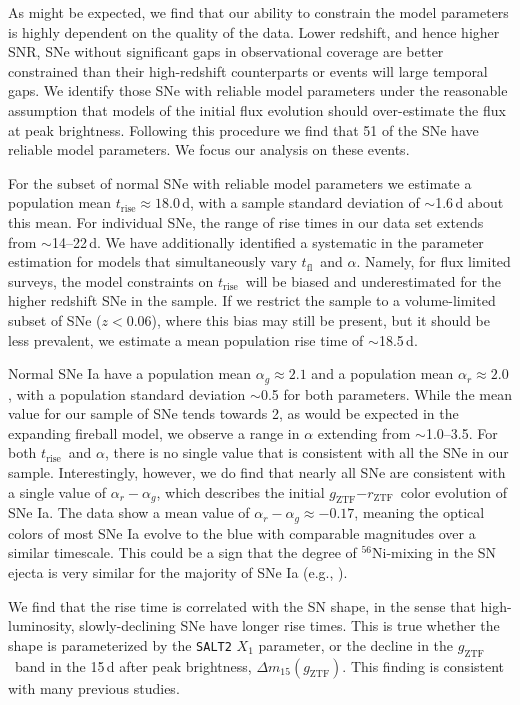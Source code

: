 \documentclass[twocolumn]{./aastex63}
\newcommand{\rztf}{$r_\mathrm{ZTF}$}
\newcommand{\gztf}{$g_\mathrm{ZTF}$}
\newcommand{\tfl}{$t_\mathrm{fl}$}
\newcommand{\trise}{$t_\mathrm{rise}$}
\begin{document}
As might be expected, we find that our ability to constrain the model parameters
is highly dependent on the quality of the data. Lower redshift, and hence higher
SNR, SNe without significant gaps in observational coverage are better
constrained than their high-redshift counterparts or events will large temporal
gaps. We identify those SNe with reliable model parameters under the reasonable
assumption that models of the initial flux evolution should over-estimate the
flux at peak brightness. Following this procedure we find that 51 of the SNe
have reliable model parameters. We focus our analysis on these events.

For the subset of normal SNe with reliable model parameters we estimate a
population mean \trise$ \approx 18.0$\,d, with a sample standard deviation of
$\sim$1.6\,d about this mean. For individual SNe, the range of rise times in our
data set extends from $\sim$14--22\,d. We have additionally identified a
systematic in the parameter estimation for models that simultaneously vary \tfl\
and $\alpha$. Namely, for flux limited surveys, the model constraints on \trise\
will be biased and underestimated for the higher redshift SNe in the sample. If
we restrict the sample to a volume-limited subset of SNe ($z < 0.06$), where
this bias may still be present, but it should be less prevalent, we estimate a
mean population rise time of $\sim$18.5\,d.

Normal SNe Ia have a population mean $\alpha_g \approx 2.1$ and a population
mean $\alpha_r \approx 2.0$, with a population standard deviation $\sim$0.5 for
both parameters. While the mean value for our sample of SNe tends towards 2, as
would be expected in the expanding fireball model, we observe a range in
$\alpha$ extending from $\sim$1.0--3.5. For both \trise\ and $\alpha$, there is
no single value that is consistent with all the SNe in our sample.
Interestingly, however, we do find that nearly all SNe are consistent with a
single value of $\alpha_r - \alpha_g$, which describes the initial \gztf$ -
$\rztf\ color evolution of SNe Ia. The data show a mean value of $\alpha_r -
\alpha_g \approx -0.17$, meaning the optical colors of most SNe Ia evolve to the
blue with comparable magnitudes over a similar timescale. This could be a sign
that the degree of $^{56}$Ni-mixing in the SN ejecta is very similar for the
majority of SNe Ia (e.g., \citealt{Piro16}).

We find that the rise time is correlated with the SN shape, in the sense that
high-luminosity, slowly-declining SNe have longer rise times. This is true
whether the shape is parameterized by the \texttt{SALT2} $X_1$ parameter, or the
decline in the \gztf\ band in the 15\,d after peak brightness, $\Delta
m_{15}(g_\mathrm{ZTF})$. This finding is consistent with many previous studies.
\end{document}
